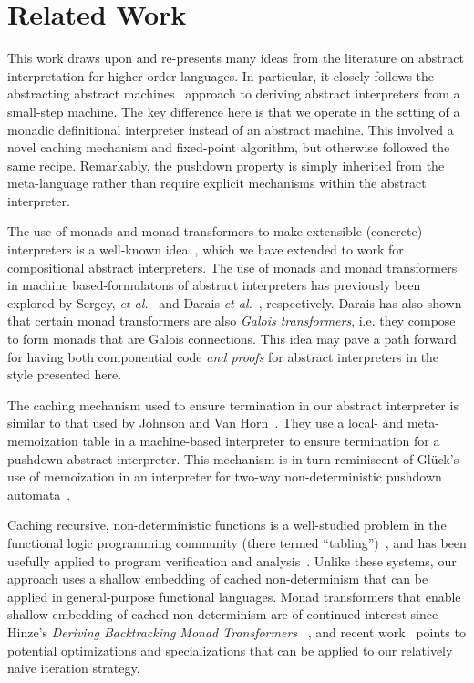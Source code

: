 \section{Related Work}

This work draws upon and re-presents many ideas from the literature on abstract
interpretation for higher-order languages.  In particular, it closely follows
the abstracting abstract
machines~\cite{dvanhorn:VanHorn2010Abstracting,dvanhorn:VanHorn2012Systematic}
approach to deriving abstract interpreters from a small-step machine. The key
difference here is that we operate in the setting of a monadic definitional
interpreter instead of an abstract machine.  This involved a novel caching
mechanism and fixed-point algorithm, but otherwise followed the same recipe.
Remarkably, the pushdown property is simply inherited from the meta-language
rather than require explicit mechanisms within the abstract interpreter.

The use of monads and monad transformers to make extensible (concrete)
interpreters is a well-known
idea~\cite{davdar:Moggi:1989:Monads,local:steele-popl94,dvanhorn:Liang1995Monad},
which we have extended to work for compositional abstract interpreters.  The
use of monads and monad transformers in machine based-formulatons of abstract
interpreters has previously been explored by Sergey, \emph{et
al.}~\cite{dvanhorn:Sergey2013Monadic} and Darais \emph{et
al.}~\cite{local:darais-oopsla2015}, respectively.  Darais has also shown that
certain monad transformers are also \emph{Galois transformers}, i.e. they
compose to form monads that are Galois connections.  This idea may pave a path
forward for having both componential code \emph{and proofs} for abstract
interpreters in the style presented here.

The caching mechanism used to ensure termination in our abstract interpreter is
similar to that used by Johnson and Van
Horn~\cite{dvanhorn:Johnson2014Abstracting}.  They use a local- and
meta-memoization table in a machine-based interpreter to ensure termination for
a pushdown abstract interpreter.  This mechanism is in turn reminiscent of
Gl\"{u}ck's use of memoization in an interpreter for two-way non-deterministic
pushdown automata~\cite{local:gluck-schmidtfest13}.

Caching recursive, non-deterministic functions is a well-studied problem in the
functional logic programming community (there termed
``tabling'')~\cite{local:tamaki1986old, local:bol1993tabulated,
  local:chen1996tabled, local:swift2012xsb}, and has been usefully applied to
program verification and analysis~\cite{local:dawson1996practical,
  local:janssens1998use}. Unlike these systems, our approach uses a shallow
embedding of cached non-determinism that can be applied in general-purpose
functional languages.
%
Monad transformers that enable shallow embedding of cached non-determinism are
of continued interest since Hinze's \emph{Deriving Backtracking Monad
  Transformers} ~\cite{local:hinze2000deriving, local:kiselyov2005backtracking,
  local:fischer2011purely}, and recent work~\cite{local:ploeg2014reflection,
  local:vandenbroucke2016fixing} points to potential optimizations and
specializations that can be applied to our relatively naive iteration strategy.

